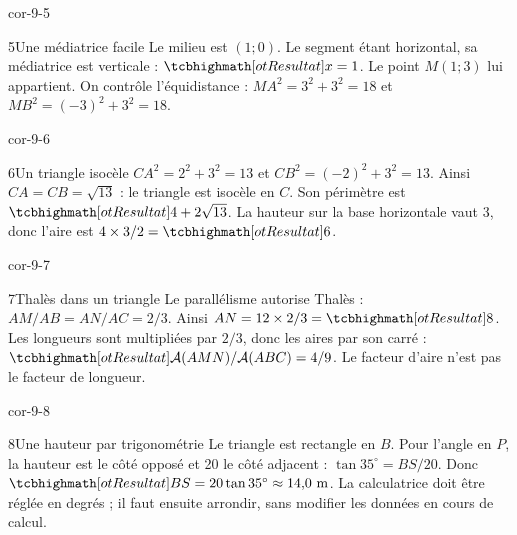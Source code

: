 \begin{blocLivre}{cor-9-5}
\begin{corrige}{5}{Une médiatrice facile}
Le milieu est $(1;0)$. Le segment étant horizontal, sa médiatrice est verticale : $\res{x=1}$. Le point $M(1;3)$ lui appartient. On contrôle l’équidistance : $MA^2=3^2+3^2=18$ et $MB^2=(-3)^2+3^2=18$.
\label{fig-cor-9-5}
\end{corrige}
\end{blocLivre}
\begin{blocLivre}{cor-9-6}
\begin{corrige}{6}{Un triangle isocèle}
$CA^2=2^2+3^2=13$ et $CB^2=(-2)^2+3^2=13$. Ainsi $CA=CB=\sqrt{13}$ : le triangle est isocèle en $C$. Son périmètre est $\res{4+2\sqrt{13}}$. La hauteur sur la base horizontale vaut 3, donc l’aire est $4\times3/2=\res6$.
\label{fig-cor-9-6}
\end{corrige}
\end{blocLivre}
\begin{blocLivre}{cor-9-7}
\begin{corrige}{7}{Thalès dans un triangle}
Le parallélisme autorise Thalès : $AM/AB=AN/AC=2/3$. Ainsi $AN=12\times2/3=\res8$. Les longueurs sont multipliées par $2/3$, donc les aires par son carré : $\res{\mathcal A(AMN)/\mathcal A(ABC)=4/9}$. Le facteur d’aire n’est pas le facteur de longueur.
\label{fig-cor-9-7}
\end{corrige}
\end{blocLivre}
\begin{blocLivre}{cor-9-8}
\begin{corrige}{8}{Une hauteur par trigonométrie}
Le triangle est rectangle en $B$. Pour l’angle en $P$, la hauteur est le côté opposé et 20 le côté adjacent : $\tan35^\circ=BS/20$. Donc $\res{BS=20\tan35^\circ\approx14{,}0\text{ m}}$. La calculatrice doit être réglée en degrés ; il faut ensuite arrondir, sans modifier les données en cours de calcul.
\label{fig-cor-9-8}
\end{corrige}
\end{blocLivre}
